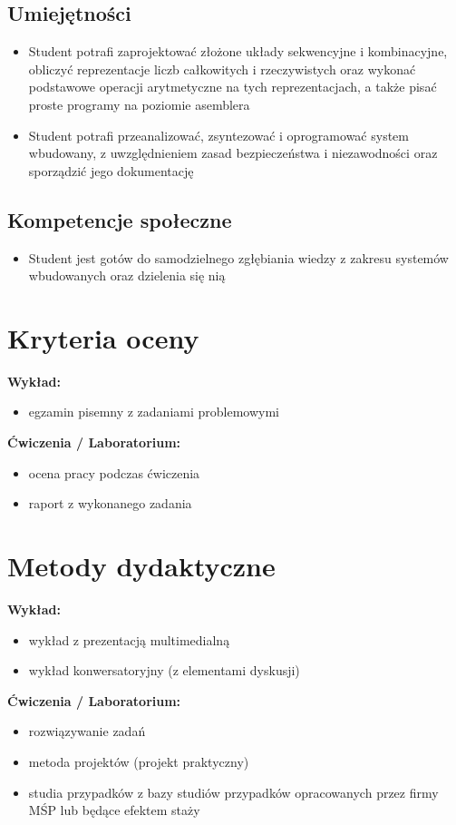 \documentclass[12pt, a4paper]{article}
\begin{document}
\subsection*{Umiejętności}
\begin{itemize}
  \item Student potrafi zaprojektować złożone układy sekwencyjne i kombinacyjne, obliczyć reprezentacje liczb całkowitych i rzeczywistych oraz wykonać podstawowe operacji arytmetyczne na tych reprezentacjach, a także pisać proste programy na poziomie asemblera
  \item Student potrafi przeanalizować, zsyntezować i oprogramować system wbudowany, z uwzględnieniem zasad bezpieczeństwa i niezawodności oraz sporządzić jego dokumentację
\end{itemize}

\subsection*{Kompetencje społeczne}
\begin{itemize}
  \item Student jest gotów do samodzielnego zgłębiania wiedzy z zakresu systemów wbudowanych oraz dzielenia się nią
\end{itemize}

\section{Kryteria oceny}

\textbf{Wykład:}
\begin{itemize}
  \item egzamin pisemny z zadaniami problemowymi
\end{itemize}
\vspace{4pt}
\textbf{Ćwiczenia / Laboratorium:}
\begin{itemize}
  \item ocena pracy podczas ćwiczenia
  \item raport z wykonanego zadania
\end{itemize}


\section{Metody dydaktyczne}

\textbf{Wykład:}
\begin{itemize}
  \item wykład z prezentacją multimedialną
  \item wykład konwersatoryjny (z elementami dyskusji)
\end{itemize}
\vspace{4pt}
\textbf{Ćwiczenia / Laboratorium:}
\begin{itemize}
  \item rozwiązywanie zadań
  \item metoda projektów (projekt praktyczny)
  \item studia przypadków z bazy studiów przypadków opracowanych przez firmy MŚP lub będące efektem staży
\end{itemize}
\vspace{4pt}
\end{document}
